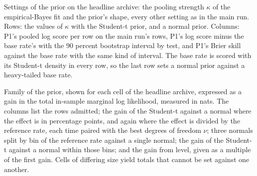 \begin{table}[t]\centering\scriptsize
\caption{Settings of the prior on the headline archive: the pooling strength $\kappa$ of the empirical-Bayes fit and the prior's shape, every other setting as in the main run. Rows: the values of $\kappa$ with the Student-t prior, and a normal prior. Columns: P1's pooled log score per row on the main run's rows, P1's log score minus the base rate's with the 90 percent bootstrap interval by test, and P1's Brier skill against the base rate with the same kind of interval. The base rate is scored with its Student-t density in every row, so the last row sets a normal prior against a heavy-tailed base rate.}
\label{tab:fmt-prior-settings}
\resizebox{\columnwidth}{!}{}
\end{table}

\begin{table}[t]\centering\scriptsize
\caption{Family of the prior, shown for each cell of the headline archive, expressed as a gain in the total in-sample marginal log likelihood, measured in nats. The columns list the rows admitted; the gain of the Student-t against a normal where the effect is in percentage points, and again where the effect is divided by the reference rate, each time paired with the best degrees of freedom $\nu$; three normals split by bin of the reference rate against a single normal; the gain of the Student-t against a normal within those bins; and the gain from level, given as a multiple of the first gain. Cells of differing size yield totals that cannot be set against one another.}
\label{tab:fmt-prior-family}
\resizebox{\columnwidth}{!}{}
\end{table}

